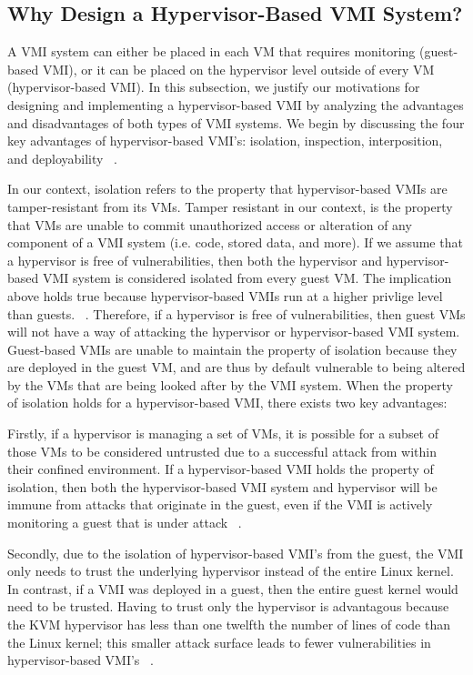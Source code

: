 \documentclass{report}
\begin{document}
\begin{spacing}{1.5}
\subsection{Why Design a Hypervisor-Based VMI System?}

{\large
A VMI system can either be placed in each VM that requires monitoring (guest-based VMI), or it can be placed on the hypervisor level outside of every VM (hypervisor-based VMI). In this subsection, we justify our motivations for designing and implementing a hypervisor-based VMI by analyzing the advantages and disadvantages of both types of VMI systems. We begin by discussing the four key advantages of hypervisor-based VMI's: isolation, inspection, interposition, and deployability ~\cite{pfoh2009formal}.
\newline
}


{\large
\noindent In our context, isolation refers to the property that hypervisor-based VMIs are tamper-resistant from its VMs. Tamper resistant in our context, is the property that VMs are unable to commit unauthorized access or alteration of any component of a VMI system (i.e. code, stored data, and more). If we assume that a hypervisor is free of vulnerabilities, then both the hypervisor and hypervisor-based VMI system is considered isolated from every guest VM. The implication above holds true because hypervisor-based VMIs run at a higher privlige level than guests. ~\cite{hebbal2015virtual}. Therefore, if a hypervisor is free of vulnerabilities, then guest VMs will not have a way of attacking the hypervisor or hypervisor-based VMI system. Guest-based VMIs are unable to maintain the property of isolation because they are deployed in the guest VM, and are thus by default vulnerable to being altered by the VMs that are being looked after by the VMI system. When the property of isolation holds for a hypervisor-based VMI, there exists two key advantages:
\newline
}

{\large
\noindent Firstly, if a hypervisor is managing a set of VMs, it is possible for a subset of those VMs to be considered untrusted due to a successful attack from within their confined environment. If a hypervisor-based VMI holds the property of isolation, then both the hypervisor-based VMI system and hypervisor will be immune from attacks that originate in the guest, even if the VMI is actively monitoring a guest that is under attack ~\cite{hebbal2015virtual}.
\newline
}

{\large
\noindent Secondly, due to the isolation of hypervisor-based VMI's from the guest, the VMI only needs to trust the underlying hypervisor instead of the entire Linux kernel. In contrast, if a VMI was deployed in a guest, then the entire guest kernel would need to be trusted. Having to trust only the hypervisor is advantagous because the KVM hypervisor has less than one twelfth the number of lines of code than the Linux kernel; this smaller attack surface leads to fewer vulnerabilities in hypervisor-based VMI's ~\cite{bauman2015survey}.
\newline
}




\end{spacing}
\end{document}
